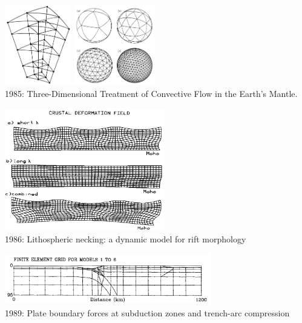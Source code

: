 \begin{center}
\begin{minipage}{0.45\textwidth}
\centering
\includegraphics[height=3.5cm]{images/history/baum85a}
\includegraphics[height=3.5cm]{images/history/baum85b}\\
{\small 1985: Three-Dimensional Treatment of Convective Flow in the Earth's Mantle.
\cite{baum85}}
\end{minipage}\hfill
\begin{minipage}{0.45\textwidth}
\centering
\includegraphics[width=7cm]{images/history/zupf86}\\
{\small 1986: Lithospheric necking: a dynamic model for rift morphology \cite{zupf86}}
\end{minipage}
\end{center}


\begin{center}
\includegraphics[width=9cm]{images/history/boww89}\\
{\small 1989: Plate boundary forces at subduction zones and trench-arc compression \cite{boww89}}
\end{center}

